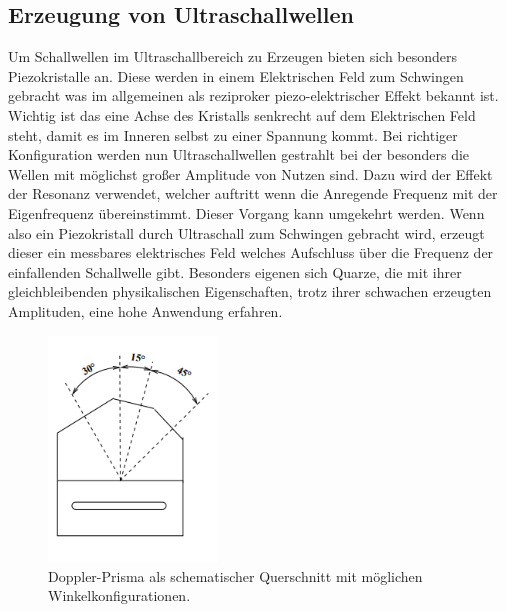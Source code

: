 \subsection{Erzeugung von Ultraschallwellen}
Um Schallwellen im Ultraschallbereich zu Erzeugen bieten sich besonders Piezokristalle an. Diese werden in einem Elektrischen Feld 
zum Schwingen gebracht was im allgemeinen als reziproker piezo-elektrischer Effekt bekannt ist. Wichtig ist das eine Achse des Kristalls
senkrecht auf dem Elektrischen Feld steht, damit es im Inneren selbst zu einer Spannung kommt. Bei richtiger Konfiguration werden nun 
Ultraschallwellen gestrahlt bei der besonders die Wellen mit möglichst großer Amplitude von Nutzen sind. 
Dazu wird der Effekt der Resonanz verwendet, welcher auftritt wenn die Anregende Frequenz mit der Eigenfrequenz übereinstimmt.
Dieser Vorgang kann umgekehrt werden. Wenn also ein Piezokristall durch Ultraschall zum Schwingen gebracht wird, erzeugt dieser ein messbares
elektrisches Feld welches Aufschluss über die Frequenz der einfallenden Schallwelle gibt. 
Besonders eigenen sich Quarze, die mit ihrer gleichbleibenden physikalischen Eigenschaften, trotz ihrer schwachen erzeugten Amplituden,
eine hohe Anwendung erfahren. 

\begin{figure}
    \centering
    \includegraphics[width=0.4\textwidth]{bilder/winkel2.png}
    \caption{Doppler-Prisma als schematischer Querschnitt mit möglichen Winkelkonfigurationen. \cite{skript}} 
    \label{fig:figskizze1}
\end{figure}